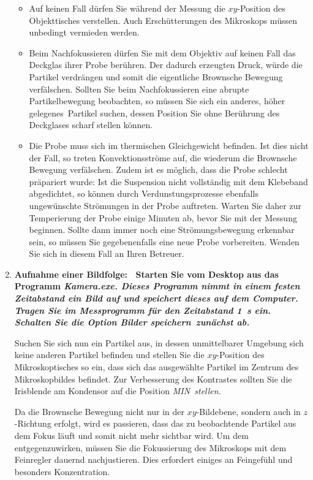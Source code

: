 \documentclass{../papanleitung}
\begin{document}
\begin{enumerate}
\begin{itemize}
\item Auf keinen Fall d\"{u}rfen Sie w\"{a}hrend der Messung die
$xy$-Position des Objekttisches verstellen. Auch Ersch\"{u}tterungen
des Mikroskops m\"{u}ssen unbedingt vermieden werden.
    \item  Beim Nachfokussieren d\"{u}rfen Sie mit dem Objektiv auf
    keinen Fall das Deckglas ihrer Probe ber\"{u}hren. Der dadurch
    erzeugten Druck, w\"{u}rde die Partikel verdr\"{a}ngen und
    somit die eigentliche Brownsche Bewegung verf\"{a}lschen. Sollten
    Sie beim Nachfokussieren eine abrupte Partikelbewegung
    beobachten, so m\"{u}ssen Sie sich ein anderes, \glqq h\"{o}her
    gelegenes\grqq~Partikel suchen, dessen Position Sie ohne
    Ber\"{u}hrung des Deckglases scharf stellen k\"{o}nnen.

     \item Die Probe muss sich im thermischen Gleichgewicht
     befinden. Ist dies nicht der Fall, so treten
     Konvektionsstr\"{o}me auf, die wiederum die Brownsche Bewegung
     verf\"{a}lschen. Zudem ist es m\"{o}glich, dass die Probe schlecht
     pr\"{a}pariert wurde: Ist die Suspension nicht vollst\"{a}ndig mit
     dem Klebeband abgedichtet, so k\"{o}nnen durch Verdunstungsprozesse
     ebenfalls ungew\"{u}nschte Str\"{o}mungen in der Probe auftreten. Warten Sie
     daher zur Temperierung der Probe einige Minuten ab, bevor Sie
     mit der Messung beginnen. Sollte dann immer noch eine Str\"{o}mungsbewegung
     erkennbar sein, so m\"{u}ssen Sie gegebenenfalls eine neue Probe vorbereiten.
     Wenden Sie sich in diesem Fall an Ihren Betreuer.
\end{itemize}


\item \bf Aufnahme einer Bildfolge: \rm~Starten Sie vom Desktop
aus das Programm \it Kamera.exe\rm. Dieses Programm nimmt in einem
festen Zeitabstand ein Bild auf und speichert dieses auf dem
Computer. Tragen Sie im Messprogramm f\"{u}r den Zeitabstand 1~s ein.
Schalten Sie die Option \it Bilder speichern\rm~zun\"{a}chst ab.

Suchen Sie sich nun ein Partikel aus, in dessen unmittelbarer
Umgebung sich keine anderen Partikel befinden und stellen Sie die
$xy$-Position des Mikroskoptisches so ein, dass sich das
ausgew\"{a}hlte Partikel im Zentrum des Mikroskopbildes befindet. Zur
Verbesserung des Kontrastes sollten Sie die Irisblende am
Kondensor auf die Position \it MIN\rm~stellen.

Da die Brownsche Bewegung nicht nur in der $xy$-Bildebene, sondern
auch in $z$-Richtung erfolgt, wird es passieren, dass das zu
beobachtende Partikel aus dem Fokus l\"{a}uft und somit nicht mehr
sichtbar wird. Um dem entgegenzuwirken, m\"{u}ssen Sie  die
Fokussierung des Mikroskops mit dem Feinregler dauernd
nachjustieren. Dies erfordert einiges an Feingef\"{u}hl und besonders
Konzentration.


\end{enumerate}
\end{document}
